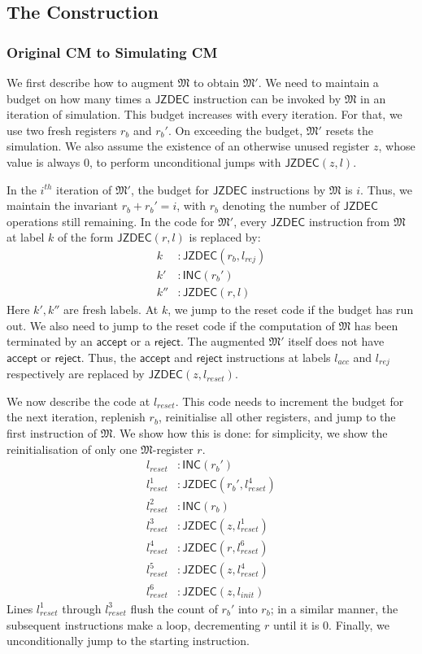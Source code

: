 \documentclass{article}
\theoremstyle{remark}
\newcommand{\machine}{\mathfrak{M}}
\newcommand{\inc}{\mathsf{INC}}
\newcommand{\jzdec}{\mathsf{JZDEC}}
\newcommand{\accept}{\mathsf{accept}}
\newcommand{\reject}{\mathsf{reject}}
\begin{document}
\subsection{The Construction}
\subsubsection{Original CM to Simulating CM}
We first describe how to augment $\machine$ to obtain $\machine'$. We need to maintain a budget on how many times a $\jzdec$ instruction can be invoked by $\machine$ in an iteration of simulation. This budget increases with every iteration. For that, we use two fresh registers $r_b$ and $r_b'$. On exceeding the budget, $\machine'$ resets the simulation. We also assume the existence of an otherwise unused register $z$, whose value is always $0$, to perform unconditional jumps with $\jzdec(z, l)$.

In the $i^{th}$ iteration of $\machine'$, the budget for $\jzdec$ instructions by $\machine$ is $i$. Thus, we maintain the invariant $r_b + r_b' = i$, with $r_b$ denoting the number of $\jzdec$ operations still remaining. In the code for $\machine'$, every $\jzdec$ instruction from $\machine$ at label $k$ of the form $\jzdec(r, l)$ is replaced by:
\begin{align*}
k &: \jzdec(r_b, l_{rej}) \\
k' &: \inc(r_b') \\
k'' &: \jzdec(r, l)
\end{align*} 
Here $k', k''$ are fresh labels. At $k$, we jump to the reset code if the budget has run out. We also need to jump to the reset code if the computation of $\machine$ has been terminated by an $\accept$ or a $\reject$. The augmented $\machine'$ itself does not have $\accept$ or $\reject$. Thus, the $\accept$ and $\reject$ instructions at labels $l_{acc}$ and $l_{rej}$ respectively are replaced by $\jzdec(z, l_{reset})$.

We now describe the code at $l_{reset}$. This code needs to increment the budget for the next iteration, replenish $r_b$, reinitialise all other registers, and jump to the first instruction of $\machine$. We show how this is done: for simplicity, we show the reinitialisation of only one $\machine$-register $r$.
\begin{align*}
l_{reset} &: \inc(r_b') \\
l_{reset}^1 &: \jzdec(r_b', l_{reset}^4) \\
l_{reset}^2 &: \inc(r_b) \\
l_{reset}^3 &: \jzdec(z, l_{reset}^1) \\
l_{reset}^4 &: \jzdec(r, l_{reset}^6) \\
l_{reset}^5 &: \jzdec(z, l_{reset}^4) \\
l_{reset}^6 &: \jzdec(z, l_{init})
\end{align*}
Lines $l_{reset}^1$ through $l_{reset}^3$ flush the count of $r_b'$ into $r_b$; in a similar manner, the subsequent instructions make a loop, decrementing $r$ until it is $0$. Finally, we unconditionally jump to the starting instruction.
\end{document}

